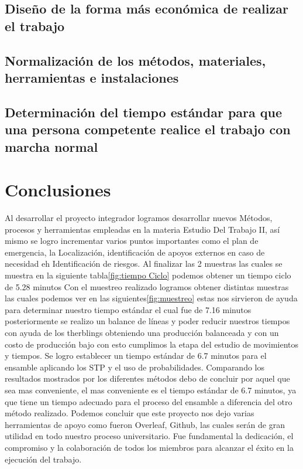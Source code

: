     \subsection{Diseño de la forma más económica de realizar el trabajo}
    
    \subsection{Normalización de los métodos, materiales, herramientas e instalaciones}
    \subsection{Determinación del tiempo estándar para que una persona competente realice el trabajo con marcha normal}
    
    \section{Conclusiones}
    Al desarrollar el proyecto integrador logramos desarrollar nuevos Métodos, procesos y herramientas empleadas en la materia Estudio Del Trabajo II, así mismo se logro incrementar varios puntos importantes como el plan de emergencia, la Localización,  identificación de apoyos externos en caso de necesidad eh Identificación de riesgos.   
    Al finalizar las 2 muestras las cuales se muestra en la siguiente tabla\ref{fig:tiempo Ciclo} podemos obtener un tiempo ciclo de 5.28 minutos Con el muestreo realizado logramos obtener distintas muestras las cuales podemos ver en las siguientes\ref{fig:muestreo} estas nos sirvieron de ayuda para determinar nuestro tiempo estándar el cual fue de 7.16 minutos posteriormente se realizo un balance de líneas y poder reducir nuestros tiempos con ayuda de los therblings obteniendo una producción balanceada y con un costo de producción bajo con esto cumplimos la etapa del estudio de movimientos y tiempos. Se logro establecer un tiempo estándar de 6.7 minutos para el ensamble aplicando los STP y el uso de probabilidades. 
    Comparando los resultados mostrados por los diferentes métodos debo de concluir por aquel que sea mas conveniente, el mas conveniente es el tiempo estándar de 6.7 minutos, ya que tiene un tiempo adecuado para el proceso del ensamble a diferencia del otro método realizado. 
    Podemos concluir que este proyecto nos dejo varias herramientas de apoyo como fueron Overleaf, Github, las cuales  serán de gran utilidad en todo nuestro proceso universitario.
    Fue fundamental la dedicación, el compromiso y la colaboración de todos los miembros para alcanzar el éxito en la ejecución del trabajo.
    
